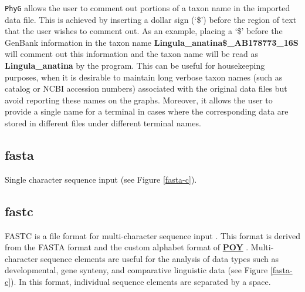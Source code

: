 \documentclass[11pt]{book}
\newcommand{\phyg}{\texttt{PhyG} }
\begin{document}
{{	\phyg allows the user to comment out portions of a taxon name 
	in the imported data file. This is achieved by inserting a dollar sign (`\$') before the region 
	of text that the user wishes to comment out. As an example, placing a `\$' before the 
	GenBank information in the taxon name \textbf{Lingula\_anatina\$\_AB178773\_16S} 
	will comment out this information and the taxon name will be read as 
	\textbf{Lingula\_anatina} by the program. This can be useful for housekeeping purposes, 
	when it is desirable to maintain long verbose taxon names (such as catalog or NCBI 
	accession numbers) associated with the original data files but avoid reporting these 
	names on the graphs. Moreover, it allows the user to provide a single name for a terminal
	in cases where the corresponding data are stored in different files under different terminal
	names.
		
	\subsection{fasta}
		Single character sequence input \citep{PearsonandLipman1988} (see Figure 
		\ref{fasta-c}).
		
	\subsection{fastc}
		FASTC is a file format for multi-character sequence input \citep{WheelerandWashburn2019}.
		This format is derived from the FASTA format and the custom alphabet format of 
		 \href{https://github.com/wardwheeler/POY5}{\textbf{POY}} \citep{POY4,POY5}. 
		 Multi-character sequence elements are useful for the analysis of data types such 
		 as developmental, gene synteny, and comparative linguistic data (see Figure 
		 \ref{fasta-c}).  In this format, individual sequence elements are separated by a space.
		 
}}
\end{document}

